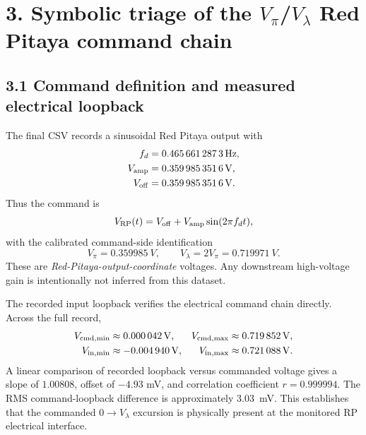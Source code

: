 \documentclass[10pt]{article}
\begin{document}
\section*{3. Symbolic triage of the $V_\pi$/$V_\lambda$ Red Pitaya command chain}

\subsection*{3.1 Command definition and measured electrical loopback}
The final CSV records a sinusoidal Red Pitaya output with
\begin{align}
f_d&=\SI{0.4656612873}{Hz},\\
V_{\rm amp}&=\SI{0.3599853516}{V},\\
V_{\rm off}&=\SI{0.3599853516}{V}.
\end{align}
Thus the command is
\begin{equation}
V_{\rm RP}(t)=V_{\rm off}+V_{\rm amp}\sin(2\pi f_dt),
\end{equation}
with the calibrated command-side identification
\begin{equation}
\boxed{V_\pi=\SI{0.359985}{V},\qquad V_\lambda=2V_\pi=\SI{0.719971}{V}.}
\label{eq:vpi}
\end{equation}
These are \emph{Red-Pitaya-output-coordinate} voltages. Any downstream high-voltage gain is intentionally not inferred from this dataset.

The recorded input loopback verifies the electrical command chain directly. Across the full record,
\begin{align*}
V_{\rm cmd,min}&\approx\SI{0.000042}{V}, & V_{\rm cmd,max}&\approx\SI{0.719852}{V},\\
V_{\rm in,min}&\approx\SI{-0.004940}{V}, & V_{\rm in,max}&\approx\SI{0.721088}{V}.
\end{align*}
A linear comparison of recorded loopback versus commanded voltage gives a slope of $1.00808$, offset of $-4.93$ mV, and correlation coefficient $r=0.999994$. The RMS command-loopback difference is approximately \SI{3.03}{mV}. This establishes that the commanded $0\rightarrow V_\lambda$ excursion is physically present at the monitored RP electrical interface.
\end{document}

